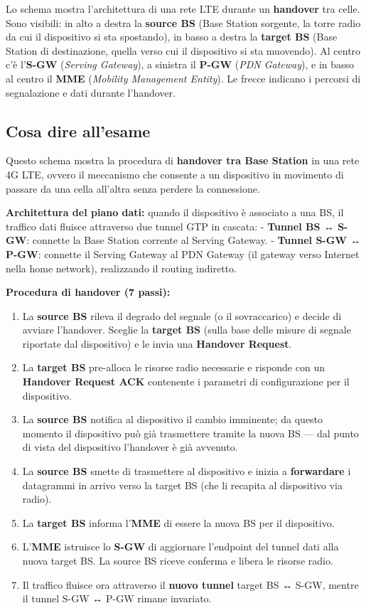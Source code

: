 \documentclass[
  italian,
  openany]{book}
\providecommand{\tightlist}{%
  \setlength{\itemsep}{0pt}\setlength{\parskip}{0pt}}
\begin{document}
Lo schema mostra l'architettura di una rete LTE durante un
\textbf{handover} tra celle. Sono visibili: in alto a destra la
\textbf{source BS} (Base Station sorgente, la torre radio da cui il
dispositivo si sta spostando), in basso a destra la \textbf{target BS}
(Base Station di destinazione, quella verso cui il dispositivo si sta
muovendo). Al centro c'è l'\textbf{S-GW} (\emph{Serving Gateway}), a
sinistra il \textbf{P-GW} (\emph{PDN Gateway}), e in basso al centro il
\textbf{MME} (\emph{Mobility Management Entity}). Le frecce indicano i
percorsi di segnalazione e dati durante l'handover.

\subsection{Cosa dire all'esame}\label{cosa-dire-allesame-5}

Questo schema mostra la procedura di \textbf{handover tra Base Station}
in una rete 4G LTE, ovvero il meccanismo che consente a un dispositivo
in movimento di passare da una cella all'altra senza perdere la
connessione.

\textbf{Architettura del piano dati:} quando il dispositivo è associato
a una BS, il traffico dati fluisce attraverso due tunnel GTP in cascata:
- \textbf{Tunnel BS ↔ S-GW}: connette la Base Station corrente al
Serving Gateway. - \textbf{Tunnel S-GW ↔ P-GW}: connette il Serving
Gateway al PDN Gateway (il gateway verso Internet nella home network),
realizzando il routing indiretto.

\textbf{Procedura di handover (7 passi):}

\begin{enumerate}
\def\labelenumi{\arabic{enumi}.}
\tightlist
\item
  La \textbf{source BS} rileva il degrado del segnale (o il
  sovraccarico) e decide di avviare l'handover. Sceglie la
  \textbf{target BS} (sulla base delle misure di segnale riportate dal
  dispositivo) e le invia una \textbf{Handover Request}.
\item
  La \textbf{target BS} pre-alloca le risorse radio necessarie e
  risponde con un \textbf{Handover Request ACK} contenente i parametri
  di configurazione per il dispositivo.
\item
  La \textbf{source BS} notifica al dispositivo il cambio imminente; da
  questo momento il dispositivo può già trasmettere tramite la nuova BS
  --- dal punto di vista del dispositivo l'handover è già avvenuto.
\item
  La \textbf{source BS} smette di trasmettere al dispositivo e inizia a
  \textbf{forwardare} i datagrammi in arrivo verso la target BS (che li
  recapita al dispositivo via radio).
\item
  La \textbf{target BS} informa l'\textbf{MME} di essere la nuova BS per
  il dispositivo.
\item
  L'\textbf{MME} istruisce lo \textbf{S-GW} di aggiornare l'endpoint del
  tunnel dati alla nuova target BS. La source BS riceve conferma e
  libera le risorse radio.
\item
  Il traffico fluisce ora attraverso il \textbf{nuovo tunnel} target BS
  ↔ S-GW, mentre il tunnel S-GW ↔ P-GW rimane invariato.
\end{enumerate}
\end{document}
